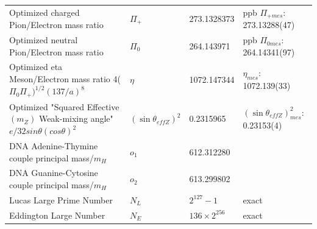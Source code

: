 \documentclass[a4paper,9pt]{article}
\begin{document}
\begin{table}
\begin{tabular}{llll}
  
  
  Optimized  charged Pion/Electron mass ratio  & $\Pi_+$ & 273.1328373  & ppb\cite{Sanchez2} $\Pi_{+mes}$: 273.13288(47)  \\     
  Optimized  neutral Pion/Electron mass ratio  & $\Pi_0$ & 264.143971  & ppb\cite{Sanchez2} $\Pi_{0mes}$: 264.14341(97)\\ 
  Optimized  eta Meson/Electron mass ratio 4($\Pi_0\Pi_+)^{1/2}(137/a)^8$  & $\eta$ & 1072.147344  &  $\eta_{mes}$: 1072.139(33)\\
  Optimized "Squared Effective $(m_Z)$ Weak-mixing angle" $e/ 32 sin \theta  (cos \theta)^2$  & $(\sin \theta_{effZ})^2$    & 0.2315965 & $(\sin \theta_{effZ})^2_{mes}$: 0.23153(4) \\
  
 DNA Adenine-Thymine couple principal mass/$m_H$ &  $o_1$   & 612.312280 & \cite{Huang} \\
 DNA Guanine-Cytosine couple principal mass/$m_H$ &  $o_2$   & 613.299802 & \cite{Huang} \\ 
  
  
   
  
   

  
                         
    Lucas Large Prime Number & $N_L$    & $2^{127}-1$  & exact \\
    Eddington Large Number & $N_{E}$    & $136\times 2^{256}$  & exact \\
          

\end{tabular}
\end{table}
\end{document}
